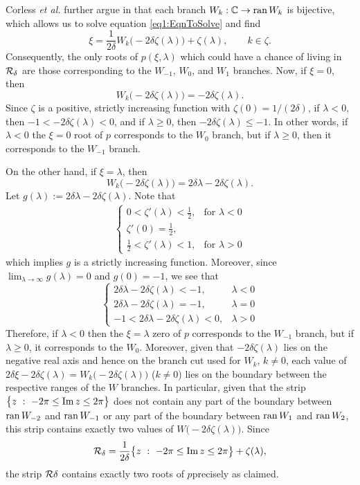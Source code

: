 \documentclass[../dissertation.tex]{subfiles}
\begin{document}
Corless {\em et al.} further argue in \cite{Corless1996} that each branch
$W_k : \mathbb{C} \to \operatorname{ran} W_k$ is bijective, which allows us to solve equation
\eqref{eq1:EqnToSolve} and find
\[
	\xi = \frac{1}{2\delta} W_k\big( -2 \delta \zeta(\lambda) \big) + \zeta(\lambda), \qquad k \in \zeta.
\]
Consequently, the only roots of $p(\xi, \lambda)$ which could have a chance of living 
in $\mathcal R_\delta$ are those corresponding to the $W_{-1}$, $W_0$, and $W_1$ branches.
Now, if $\xi = 0$, then 
\[
	W_k\big( -2 \delta \zeta(\lambda) \big) = -2 \delta \zeta(\lambda).
\]
Since $\zeta$ is a positive, strictly increasing function with $\zeta(0) = 1/(2\delta)$, 
if $\lambda < 0$, then $-1 < -2\delta \zeta(\lambda) < 0$, and if $\lambda \geq 0$, then 
$-2 \delta \zeta(\lambda) \leq -1$. In other words, if $\lambda < 0$ the $\xi = 0$ root of $p$ 
corresponds to the $W_0$ branch, but if $\lambda \geq 0$, then it corresponds to the 
$W_{-1}$ branch. 

On the other hand, if $\xi = \lambda$, then
\[
	W_k\big( -2 \delta \zeta(\lambda) \big) = 2\delta \lambda -2 \delta \zeta(\lambda).
\]
Let $g(\lambda):= 2\delta \lambda -2 \delta \zeta(\lambda)$. 
Note that
\begin{align*}
	\begin{cases}
		0 < \zeta'(\lambda) < \frac{1}{2}, & \text{for } \lambda < 0 \\
		\zeta'(0) = \frac{1}{2}, &  \\
		\frac{1}{2} < \zeta'(\lambda) < 1, & \text{for } \lambda > 0
	\end{cases}
\end{align*}
which implies $g$ is a strictly increasing function. Moreover, since
$\lim_{\lambda\to \infty} g(\lambda) = 0$ and $g(0) = -1$, we see that 
\[
	\begin{cases}
		2\delta \lambda -2 \delta \zeta(\lambda)  < -1, & \lambda < 0 \\
		2\delta \lambda -2 \delta \zeta(\lambda) = -1, & \lambda = 0 \\
		-1 < 2\delta \lambda -2 \delta \zeta(\lambda) < 0, & \lambda > 0
	\end{cases}
\]
Therefore, if $\lambda < 0$ then the $\xi = \lambda$ zero of $p$ corresponds to the 
$W_{-1}$ branch, but if $\lambda \geq 0$, it corresponds to the $W_{0}$. Moreover, 
given that $-2\delta \zeta(\lambda)$ lies on the negative real axis and hence on the branch
cut used for $W_k$, $k \ne 0$, each value of 
$2\delta\xi-2\delta\zeta(\lambda) = W_k\big(-2\delta\zeta(\lambda)\big)$ ($k \ne 0$) lies on the boundary
between the respective ranges of the $W$ branches. In particular, given that 
the strip $\big\{ z ~:~ -2\pi \leq \operatorname{Im} z \leq 2 \pi \big\}$ does not contain
any part of the boundary between $\operatorname{ran} W_{-2}$ and $\operatorname{ran} W_{-1}$ or any part 
of the boundary between $\operatorname{ran} W_1$ and $\operatorname{ran} W_2$, this strip contains exactly 
two values of $W\big(-2 \delta \zeta(\lambda) \big)$. Since
\[
	\mathcal R_\delta = \frac{1}{2\delta}\big\{ z ~:~ -2\pi \leq \operatorname{Im} z \leq 2 \pi \big\}+\zeta(\lambda),
\]
the strip $\mathcal R\delta$ contains exactly two roots of $p$\textemdash{}precisely as claimed.
\end{document}
